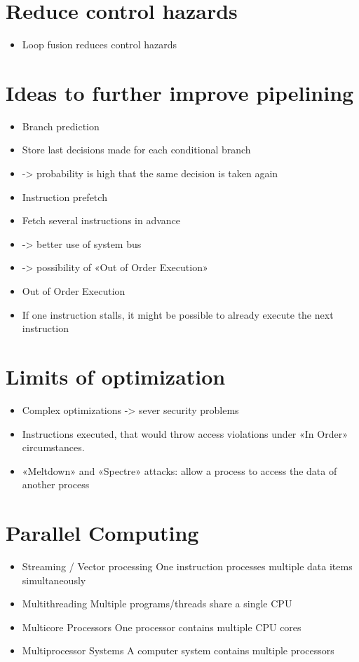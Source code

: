    \section*{Reduce control hazards}
    \begin{itemize}
      \item Loop fusion reduces control hazards
    \end{itemize}
    
    \section*{Ideas to further improve pipelining}
    \begin{itemize}
      \item Branch prediction
      \item Store last decisions made for each conditional branch
      \item -> probability is high that the same decision is taken again
      \item Instruction prefetch
      \item Fetch several instructions in advance
      \item -> better use of system bus
      \item -> possibility of «Out of Order Execution»
      \item Out of Order Execution
      \item If one instruction stalls, it might be possible to already execute the next instruction
    \end{itemize}
    
    \section*{Limits of optimization}
    \begin{itemize}
      \item Complex optimizations -> sever security problems
      \item Instructions executed, that would throw access violations under «In Order» circumstances.
      \item «Meltdown» and «Spectre» attacks: allow a process to access the data of another process
    \end{itemize}
    
    \section*{Parallel Computing}
    \begin{itemize}
      \item Streaming / Vector processing One instruction processes multiple data items simultaneously
      \item Multithreading Multiple programs/threads share a single CPU
      \item Multicore Processors One processor contains multiple CPU cores
      \item Multiprocessor Systems A computer system contains multiple processors
    \end{itemize}